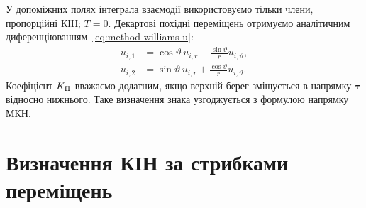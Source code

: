 У допоміжних полях інтеграла взаємодії використовуємо тільки члени, пропорційні КІН; $T=0$. Декартові похідні переміщень отримуємо аналітичним диференціюванням~\eqref{eq:method-williams-u}:
\begin{equation}
 \begin{aligned}
 u_{i,1}&=\cos\vartheta\,u_{i,r}
        -\frac{\sin\vartheta}{r}u_{i,\vartheta},\\
 u_{i,2}&=\sin\vartheta\,u_{i,r}
        +\frac{\cos\vartheta}{r}u_{i,\vartheta}.
 \end{aligned}
 \label{eq:method-williams-gradient}
\end{equation} Коефіцієнт $K_{\mathrm{II}}$ вважаємо додатним, якщо верхній берег зміщується в напрямку $\boldsymbol\tau$ відносно нижнього. Таке визначення знака узгоджується з формулою напрямку МКН.

\section{Визначення КІН за стрибками переміщень}
\label{sec:methods-cod}


